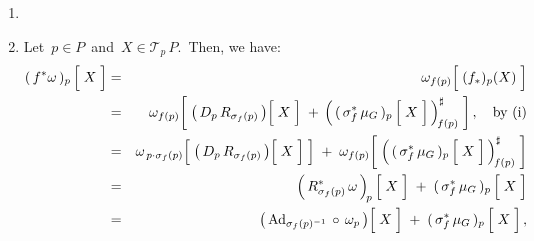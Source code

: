 \begin{enumerate}
\begin{eqnarray*}
	& = &
		\left(\,D_{p}\,R_{\sigma_{f}(p)}\,\right)\!\left[\;\overset{{\color{white}.}}{X}\;\right]
		\; + \,
		\left(\,
			(\,\sigma_{f}^{*}\,\mu_{G}\,)_{p}
			\left[\;\overset{{\color{white}.}}{X}\;\right]
			\,\right)^{\sharp}_{\!f(p)}\,,
	\end{eqnarray*}
	where the last equality follows from the following commutative diagram:
	\begin{center}
	\end{center}
\item
\item
	Let \,$p \in P$\, and \,$X \in \mathcal{T}_{p}\,P$.\,
	Then, we have:
	\begin{eqnarray*}
	(\,f^{*}\omega\,)_{p}\left[\;\overset{{\color{white}.}}{X}\;\right]
	& = &
		\omega_{f(p)}\!\left[\;(\overset{{\color{white}.}}{f_{*})_{p}(X)}\;\right]
	\\
	& = &
		\omega_{f(p)}\!\left[\;
			\left(\,D_{p}\,R_{\sigma_{f}(p)}\,\right)\!\left[\;\overset{{\color{white}.}}{X}\;\right]
			\; + \,
			\left(\,
				(\,\sigma_{f}^{*}\,\mu_{G}\,)_{p}
				\left[\;\overset{{\color{white}.}}{X}\;\right]
				\,\right)^{\sharp}_{\!f(p)}
			\;\right],
		\quad
		\textnormal{by (i)}
	\\
	& = &
		\omega_{\,p \cdot \sigma_{f}(p)}\!\left[\;
			\left(\,D_{p}\,R_{\sigma_{f}(p)}\,\right)\!\left[\;\overset{{\color{white}.}}{X}\;\right]
			\;\right]
		\; + \;
		\omega_{f(p)}\!\left[\;
			\left(\,
				(\,\sigma_{f}^{*}\,\mu_{G}\,)_{p}
				\left[\;\overset{{\color{white}.}}{X}\;\right]
				\,\right)^{\sharp}_{\!f(p)}
			\;\right]
	\\
	& = &
		\left(\,R_{\sigma_{f}(p)}^{*}\,\omega\,\right)_{\!p}
		\left[\;\overset{{\color{white}.}}{X}\;\right]
		\; + \;
		(\,\sigma_{f}^{*}\,\mu_{G}\,)_{p}
		\left[\;\overset{{\color{white}.}}{X}\;\right]
	\\
	& = &
		\left(\,\Ad_{\sigma_{f}(p)^{-1}}\,\circ\,\omega_{p}\,\right)\!
		\left[\;\overset{{\color{white}.}}{X}\;\right]
		\; + \;
		(\,\sigma_{f}^{*}\,\mu_{G}\,)_{p}
		\left[\;\overset{{\color{white}.}}{X}\;\right],

\end{eqnarray*}
\end{enumerate}
